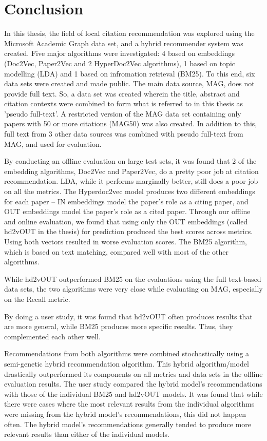 \chapter{Conclusion}\label{chap:conclusion}

In this thesis, the field of local citation recommendation was explored using the Microsoft Academic Graph data set, and a hybrid recommender system was created. Five major algorithms were investigated: 4 based on embeddings (Doc2Vec, Paper2Vec and 2 HyperDoc2Vec algorithms), 1 based on topic modelling (LDA) and 1 based on infromation retrieval (BM25). 
To this end, six data sets were created and made public. The main data source, MAG, does not provide full text. So, a data set was created wherein the title, abstract and citation contexts were combined to form what is referred to in this thesis as 'pseudo full-text'. A restricted version of the MAG data set containing only papers with 50 or more citations (MAG50) was also created. In addition to this, full text from 3 other data sources was combined with pseudo full-text from MAG, and used for evaluation.

By conducting an offline evaluation on large test sets, it was found that 2 of the embedding algorithms, Doc2Vec and Paper2Vec, do a pretty poor job at citation recommendation. LDA, while it performs marginally better, still does a poor job on all the metrics. The Hyperdoc2vec model produces two different embeddings for each paper -- IN embeddings model the paper's role as a citing paper, and OUT embeddings model the paper's role as a cited paper. Through our offline and online evaluation, we found that using only the OUT embeddings (called hd2vOUT in the thesis) for prediction produced the best scores across metrics. Using both vectors resulted in worse evaluation scores. The BM25 algorithm, which is based on text matching, compared well with most of the other algorithms.

While hd2vOUT outperformed BM25 on the evaluations using the full text-based data sets, the two algorithms were very close while evaluating on MAG, especially on the Recall metric.

By doing a user study, it was found that hd2vOUT often produces results that are more general, while BM25 produces more specific results. Thus, they complemented each other well. 

Recommendations from both algorithms were combined stochastically using a semi-genetic hybrid recommendation algorithm. This hybrid algorithm/model drastically outperformed its components on all metrics and data sets in the offline evaluation results. The user study compared the hybrid model's recommendations with those of the individual BM25 and hd2vOUT models. It was found that while there were cases where the most relevant results from the individual algorithms were missing from the hybrid model's recommendations, this did not happen often. The hybrid model's recommendations generally tended to produce more relevant results than either of the individual models.

